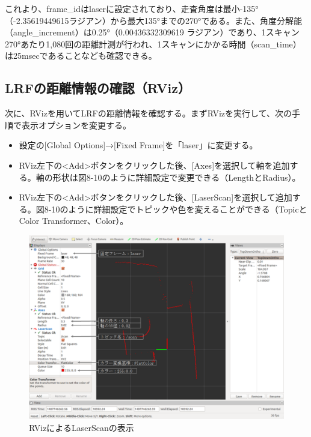 これより、frame\_idはlaserに設定されており、走査角度は最小-135°（-2.35619449615ラジアン）から最大135°までの270°である。また、角度分解能（angle\_increment）は0.25°（0.00436332309619 ラジアン）であり、1スキャン270°あたり1,080回の距離計測が行われ、1スキャンにかかる時間（scan\_time）は25msecであることなども確認できる。

\subsection{LRFの距離情報の確認（RViz）}

次に、RVizを用いてLRFの距離情報を確認する。まずRVizを実行して、次の手順で表示オプションを変更する。

\begin{itemize}
\item 設定の[Global Options]→[Fixed Frame]を「laser」に変更する。
\item RViz左下の<Add>ボタンをクリックした後、[Axes]を選択して軸を追加する。軸の形状は図8-10のように詳細設定で変更できる（LengthとRadius）。
\item RViz左下の<Add>ボタンをクリックした後、[LaserScan]を選択して追加する。図8-10のように詳細設定でトピックや色を変えることができる（TopicとColor Transformer、Color）。
\end{itemize}

\begin{figure}[ht]
  \centering
  \includegraphics[width=\columnwidth]{pictures/chapter8/pic_08_10.png}
  \caption{RVizによるLaserScanの表示}
\end{figure}

